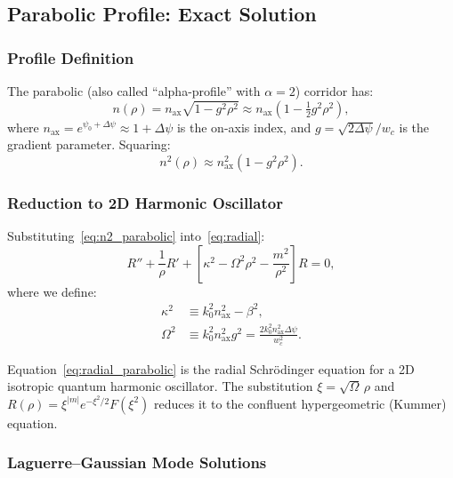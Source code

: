 \documentclass[journal,twocolumn]{IEEEtran}
\begin{document}
\subsection{Parabolic Profile: Exact Solution}

\subsubsection{Profile Definition}

The parabolic (also called ``alpha-profile'' with $\alpha=2$) corridor has:
\begin{equation}
n(\rho) = n_\text{ax}\sqrt{1 - g^2\rho^2}
\approx n_\text{ax}\left(1 - \tfrac{1}{2}g^2\rho^2\right),
\label{eq:parabolic_n}
\end{equation}
where $n_\text{ax} = e^{\psi_0 + \Delta\psi} \approx 1 + \Delta\psi$
is the on-axis index, and $g = \sqrt{2\Delta\psi}/w_c$ is the gradient
parameter. Squaring:
\begin{equation}
n^2(\rho) \approx n_\text{ax}^2(1 - g^2\rho^2).
\label{eq:n2_parabolic}
\end{equation}

\subsubsection{Reduction to 2D Harmonic Oscillator}

Substituting~\eqref{eq:n2_parabolic} into~\eqref{eq:radial}:
\begin{equation}
R'' + \frac{1}{\rho}R'
+ \left[\kappa^2 - \Omega^2\rho^2 - \frac{m^2}{\rho^2}\right]R = 0,
\label{eq:radial_parabolic}
\end{equation}
where we define:
\begin{align}
\kappa^2 &\equiv k_0^2 n_\text{ax}^2 - \beta^2, \label{eq:kappa_def}\\
\Omega^2 &\equiv k_0^2 n_\text{ax}^2 g^2 = \frac{2k_0^2 n_\text{ax}^2 \Delta\psi}{w_c^2}.
\label{eq:Omega_def}
\end{align}

Equation~\eqref{eq:radial_parabolic} is the radial Schr\"odinger equation
for a 2D isotropic quantum harmonic oscillator. The substitution
$\xi = \sqrt{\Omega}\,\rho$ and $R(\rho) = \xi^{|m|} e^{-\xi^2/2} F(\xi^2)$
reduces it to the confluent hypergeometric (Kummer) equation.

\subsubsection{Laguerre--Gaussian Mode Solutions}
\end{document}
